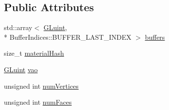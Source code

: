 \subsection*{Public Attributes}
\begin{DoxyCompactItemize}
\item 
std\-::array$<$ \hyperlink{Shader_8hpp_aa311c7f0d6ec4f1a33f9235c3651b86b}{G\-Luint}, \\*
Buffer\-Indices\-::\-B\-U\-F\-F\-E\-R\-\_\-\-L\-A\-S\-T\-\_\-\-I\-N\-D\-E\-X $>$ \hyperlink{structrenderer_1_1BufferedModel_1_1MeshInfo_a9b601e962fe9f0cb4b57517fb7a468ae}{buffers}
\item 
size\-\_\-t \hyperlink{structrenderer_1_1BufferedModel_1_1MeshInfo_a063d231567cb1d5e5f2960f538a0eabb}{material\-Hash}
\item 
\hyperlink{Shader_8hpp_aa311c7f0d6ec4f1a33f9235c3651b86b}{G\-Luint} \hyperlink{structrenderer_1_1BufferedModel_1_1MeshInfo_a4bda08976af2f4d2e9c06f0aab773b01}{vao}
\item 
unsigned int \hyperlink{structrenderer_1_1BufferedModel_1_1MeshInfo_ac6add8731c532c5ac5c1b26fc16130c5}{num\-Vertices}
\item 
unsigned int \hyperlink{structrenderer_1_1BufferedModel_1_1MeshInfo_afbb21a00c2a1d49f15fcd5bc42f81bab}{num\-Faces}
\end{DoxyCompactItemize}


